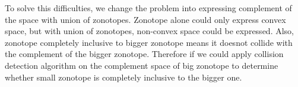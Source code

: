 \documentclass[lettersize,journal]{IEEEtran}
\begin{document}
To solve this difficulties, we change the problem into expressing complement of the space with union of zonotopes.
Zonotope alone could only express convex space, but with union of zonotopes, non-convex space could be expressed.
Also, zonotope completely inclusive to bigger zonotope means it doesnot collide with the complement of the bigger zonotope.
Therefore if we could apply collision detection algorithm on the complement space of big zonotope to determine whether small zonotope is completely inclusive to the bigger one.




\end{document}
